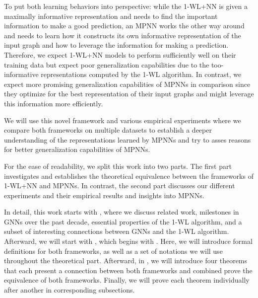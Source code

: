To put both learning behaviors into perspective: while the 1-WL+NN is given a maximally informative representation and needs to find the important information to make a good prediction, an MPNN works the other way around and needs to learn how it constructs its own informative representation of the input graph and how to leverage the information for making a prediction. Therefore, we expect 1-WL+NN models to perform sufficiently well on their training data but expect poor generalization capabilities due to the too-informative representations computed by the 1-WL algorithm. In contrast, we expect more promising generalization capabilities of MPNNs in comparison since they optimize for the best representation of their input graphs and might leverage this information more efficiently. 

We will use this novel framework and various empirical experiments where we compare both frameworks on multiple datasets to establish a deeper understanding of the representations learned by MPNNs and try to asses reasons for better generalization capabilities of MPNNs.

For the ease of readability, we split this work into two parts. The first part investigates and establishes the theoretical equivalence between the frameworks of 1-WL+NN and MPNNs. In contrast, the second part discusses our different experiments and their empirical results and insights into MPNNs.

In detail, this work starts with , where we discuss related work, milestones in GNNs over the past decade, essential properties of the 1-WL algorithm, and a subset of interesting connections between GNNs and the 1-WL algorithm. Afterward, we will start with , which begins with . Here, we will introduce formal definitions for both frameworks, as well as a set of notations we will use throughout the theoretical part. Afterward, in , we will introduce four theorems that each present a connection between both frameworks and combined prove the equivalence of both frameworks. Finally, we will prove each theorem individually after another in corresponding subsections.

